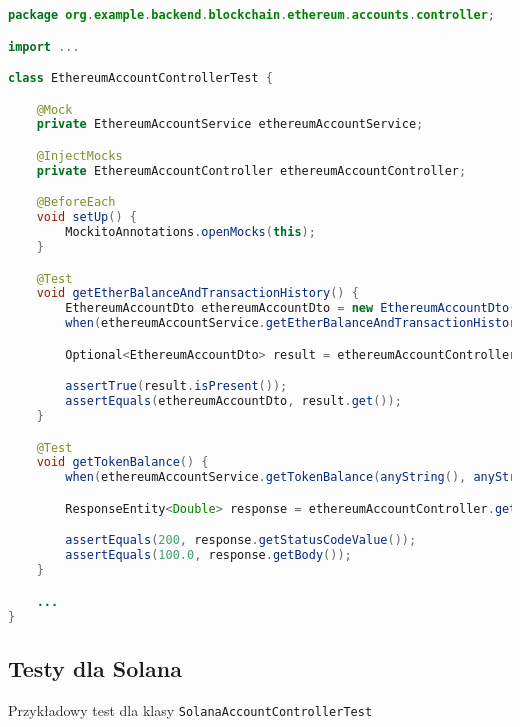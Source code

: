 \begin{lstlisting}[language=Java]
package org.example.backend.blockchain.ethereum.accounts.controller;

import ...

class EthereumAccountControllerTest {

    @Mock
    private EthereumAccountService ethereumAccountService;

    @InjectMocks
    private EthereumAccountController ethereumAccountController;

    @BeforeEach
    void setUp() {
        MockitoAnnotations.openMocks(this);
    }

    @Test
    void getEtherBalanceAndTransactionHistory() {
        EthereumAccountDto ethereumAccountDto = new EthereumAccountDto();
        when(ethereumAccountService.getEtherBalanceAndTransactionHistory(anyString())).thenReturn(Optional.of(ethereumAccountDto));

        Optional<EthereumAccountDto> result = ethereumAccountController.GetEtherBalanceAndTransactionHistory("testAddress");

        assertTrue(result.isPresent());
        assertEquals(ethereumAccountDto, result.get());
    }

    @Test
    void getTokenBalance() {
        when(ethereumAccountService.getTokenBalance(anyString(), anyString())).thenReturn(100.0);

        ResponseEntity<Double> response = ethereumAccountController.getTokenBalance("testAddress", "testContractAddress");

        assertEquals(200, response.getStatusCodeValue());
        assertEquals(100.0, response.getBody());
    }

    ...
}
\end{lstlisting}

\subsection{Testy dla Solana}

Przykładowy test dla klasy \texttt{SolanaAccountControllerTest}


